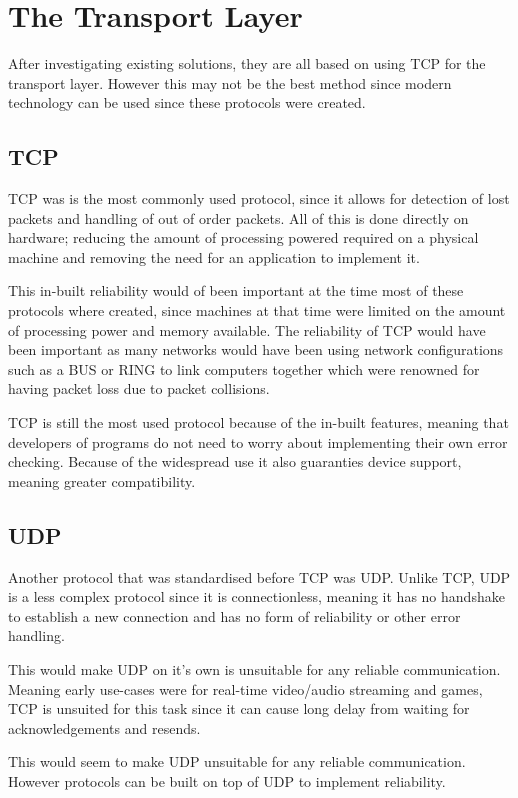 \section{The Transport Layer}
After investigating existing solutions, they are all based on using TCP for the transport layer. However this may not be the best method since modern technology can be used since these protocols were created.

\subsection*{TCP}
TCP was is the most commonly used protocol, since it allows for detection of lost packets and handling of out of order packets. All of this is done directly on hardware; reducing the amount of processing powered required on a physical machine and removing the need for an application to implement it.

This in-built reliability would of been important at the time most of these protocols where created, since machines at that time were limited on the amount of processing power and memory available. The reliability of TCP would have been important as many networks would have been using network configurations such as a BUS or RING to link computers together which were renowned for having packet loss due to packet collisions.

TCP is still the most used protocol because of the in-built features, meaning that developers of programs do not need to worry about implementing their own error checking. Because of the widespread use it also guaranties device support, meaning greater compatibility.

\subsection*{UDP}
Another protocol that was standardised before TCP was UDP. Unlike TCP, UDP is a less complex protocol since it is connectionless, meaning it has no handshake to establish a new connection and has no form of reliability or other error handling.

This would make UDP on it's own is unsuitable for any reliable communication. Meaning early use-cases were for real-time video/audio streaming and games, TCP is unsuited for this task since it can cause long delay from waiting for acknowledgements and resends.

This would seem to make UDP unsuitable for any reliable communication. However protocols can be built on top of UDP to implement reliability.

